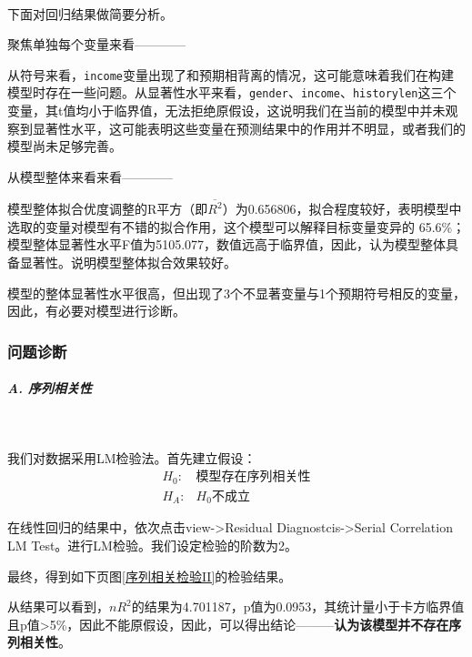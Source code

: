 \documentclass[13.5pt,hyperref,a4paper,UTF8]{ctexart}
\begin{document}
\

下面对回归结果做简要分析。

聚焦单独每个变量来看————

从符号来看，\texttt{income}变量出现了和预期相背离的情况，这可能意味着我们在构建模型时存在一些问题。从显著性水平来看，\texttt{gender}、\texttt{income}、\texttt{historylen}这三个变量，其t值均小于临界值，无法拒绝原假设，这说明我们在当前的模型中并未观察到显著性水平，这可能表明这些变量在预测结果中的作用并不明显，或者我们的模型尚未足够完善。


从模型整体来看来看————

模型整体拟合优度调整的R平方（即$\overline{R^2}$）为0.656806，拟合程度较好，表明模型中选取的变量对模型有不错的拟合作用，这个模型可以解释目标变量变异的 65.6\%；模型整体显著性水平F值为5105.077，数值远高于临界值，因此，认为模型整体具备显著性。说明模型整体拟合效果较好。

模型的整体显著性水平很高，但出现了3个不显著变量与1个预期符号相反的变量，因此，有必要对模型进行诊断。

\subsubsection{问题诊断}
\subparagraph {A. 序列相关性}
\

我们对数据采用LM检验法。首先建立假设：
\begin{equation}
    \begin{split}
        H_0:& 模型存在序列相关性 \\
        H_A:& H_0不成立 \nonumber
    \end{split}
\end{equation}

在线性回归的结果中，依次点击view->Residual Diagnostcis->Serial Correlation LM Test。进行LM检验。我们设定检验的阶数为2。

最终，得到如下页图\ref{序列相关检验II}的检验结果。

从结果可以看到，$nR^2$的结果为4.701187，p值为0.0953，其统计量小于卡方临界值且p值>5\%，因此不能原假设，因此，可以得出结论———\textbf{认为该模型并不存在序列相关性}。
\end{document}
